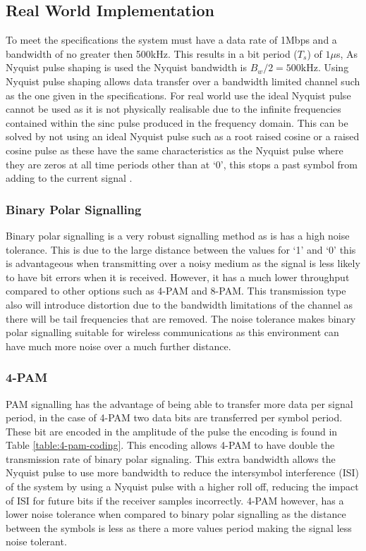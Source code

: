 \subsection{Real World Implementation}

To meet the specifications the system must have a data rate of 1Mbps and a bandwidth of no greater then
500kHz. This results in a bit period ($T_s$) of $1\mu$s, As Nyquist pulse shaping is used the Nyquist
bandwidth is $B_w / 2 = 500\textrm{kHz}$. Using Nyquist pulse shaping allows data transfer over a
bandwidth limited channel such as the one given in the specifications. For real world use the ideal
Nyquist pulse cannot be used as it is not physically realisable due to the infinite frequencies 
contained within the sinc pulse produced in the frequency domain. This can be solved by not using
an ideal Nyquist pulse such as a root raised cosine or a raised cosine pulse as these have the same characteristics
as the Nyquist pulse where they are zeros at all time periods other than at `0', this stops a past symbol
from adding to the current signal .

\subsubsection{Binary Polar Signalling}
Binary polar signalling is a very robust signalling method as is has a high noise tolerance. This is
due to the large distance between the values for `1' and `0' this is advantageous when transmitting
over a noisy medium as the signal is less likely to have bit errors when it is received.
However, it has a much lower throughput compared to other options such as 4-PAM and 8-PAM. This transmission type also
will introduce distortion due to the bandwidth limitations of the channel as there will be tail frequencies that are
removed. The noise tolerance makes binary polar signalling suitable for wireless communications as this environment 
can have much more noise over a much further distance.


\subsubsection{4-PAM}
PAM signalling has the advantage of being able to transfer more data per signal period, in the case of 4-PAM
two data bits are transferred per symbol period. These bit are encoded in the amplitude of the pulse
the encoding is found in Table \ref{table:4-pam-coding}. This encoding allows 4-PAM to have double the transmission
rate of binary polar signaling. This extra bandwidth allows the Nyquist pulse to use more bandwidth to reduce the intersymbol
interference (ISI) of the system by using a Nyquist pulse with a higher roll off, reducing the impact of ISI for future bits
if the receiver samples incorrectly. 4-PAM however, has a lower noise tolerance when compared to binary polar signalling as
the distance between the symbols is less as there a more values period making the signal less noise tolerant.

